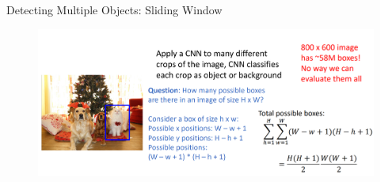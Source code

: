 \begin{frame}[allowframebreaks]{Detecting Multiple Objects: Sliding Window}
\framebreak

\begin{figure}
\centering
\includegraphics[width=1.0\textwidth,height=1.0\textheight,keepaspectratio]{images/object-detect/object_16.png}
\end{figure}

\end{frame}